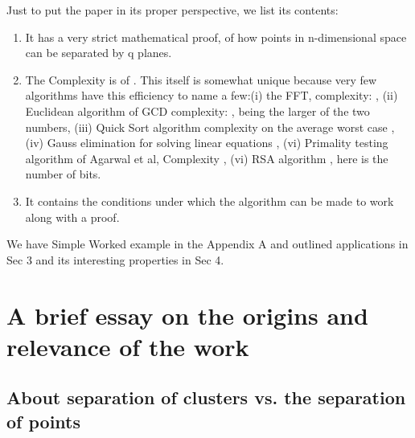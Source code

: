 \documentclass[english]{article}
\begin{document}
\medskip{}


Just to put the paper in its proper perspective, we list its contents: 
\begin{enumerate}
\item It has a very strict mathematical proof, of how  points in n-dimensional
space can be separated by q planes.
\item The Complexity is of . This itself is somewhat unique because
very few algorithms have this efficiency to name a few:(i) the FFT,
complexity: , (ii) Euclidean algorithm of GCD complexity:
,  being the larger of the two numbers, (iii) Quick Sort
algorithm complexity on the average  worst case ,
(iv) Gauss elimination for solving  linear equations ,
(vi) Primality testing algorithm of Agarwal et al, Complexity ,
(vi) RSA algorithm , here  is the number of bits.
\item It contains the conditions under which the algorithm can be made to
work along with a proof. 
\end{enumerate}
We have Simple Worked example in the Appendix A and outlined applications
in Sec 3 and its interesting properties in Sec 4.

\medskip{}



\section*{A brief essay on the origins and relevance of the work}

\medskip{}



\subsection*{About separation of clusters vs. the separation of points }
\end{document}
